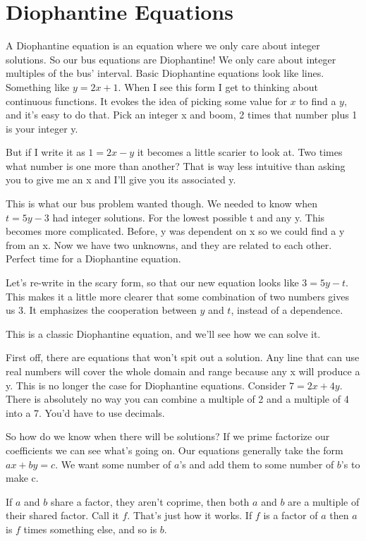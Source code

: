 \documentclass{article}
\begin{document}
    \section{Diophantine Equations}
    A Diophantine equation is an equation where we only care about integer solutions.
    So our bus equations are Diophantine!
    We only care about integer multiples of the bus' interval.
    Basic Diophantine equations look like lines.
    Something like $y = 2x + 1$.
    When I see this form I get to thinking about continuous functions.
    It evokes the idea of picking some value for $x$ to find a $y$, and it's easy to do that.
    Pick an integer x and boom, 2 times that number plus 1 is your integer y.

    But if I write it as $1 = 2x - y$ it becomes a little scarier to look at.
    Two times what number is one more than another?
    That is way less intuitive than asking you to give me an x and I'll give you its associated y.

    This is what our bus problem wanted though.
    We needed to know when $t = 5y - 3$ had integer solutions.
    For the lowest possible t and any y.
    This becomes more complicated.
    Before, y was dependent on x so we could find a y from an x.
    Now we have two unknowns, and they are related to each other.
    Perfect time for a Diophantine equation.

    Let's re-write in the scary form, so that our new equation looks like $3 = 5y - t$.
    This makes it a little more clearer that some combination of two numbers gives us 3.
    It emphasizes the cooperation between $y$ and $t$, instead of a dependence.
    
    This is a classic Diophantine equation, and we'll see how we can solve it.

    First off, there are equations that won't spit out a solution.
    Any line that can use real numbers will cover the whole domain and range because any x will produce a y.
    This is no longer the case for Diophantine equations.
    Consider $7 = 2x + 4y$.
    There is absolutely no way you can combine a multiple of 2 and a multiple of 4 into a 7.
    You'd have to use decimals.

    So how do we know when there will be solutions?
    If we prime factorize our coefficients we can see what's going on.
    Our equations generally take the form $ax + by = c$.
    We want some number of $a$'s and add them to some number of $b$'s to make c.
    
    If $a$ and $b$ share a factor, they aren't coprime, then both $a$ and $b$ are a multiple of their shared factor.
    Call it $f$.
    That's just how it works. If $f$ is a factor of $a$ then $a$ is $f$ times something else, and so is $b$.
    
\end{document}
